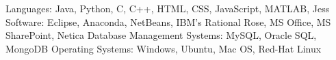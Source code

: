 \begin{cvhonors}
  \cvhonor
    {Languages:}
    {Java, Python, C, C++, HTML, CSS, JavaScript, MATLAB, Jess}
    {}
    {}
  \cvhonor
    {Software:}
    {Eclipse, Anaconda, NetBeans, IBM's Rational Rose, MS Office, MS SharePoint, Netica}
    {}
    {}
  \cvhonor
    {Database Management Systems:}
    {MySQL, Oracle SQL, MongoDB}
    {}
    {}
  \cvhonor
    {Operating Systems:}
    {Windows, Ubuntu, Mac OS, Red-Hat Linux}
    {}
    {}  
\end{cvhonors}

